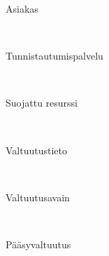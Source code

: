 

\begin{description}
  \item[Asiakas]\hfill \\
    
  \item[Tunnistautumispalvelu]\hfill \\
    
  \item[Suojattu resurssi]\hfill \\
    
  \item[Valtuutustieto]\hfill \\
    
  \item[Valtuutusavain]\hfill \\
    
  \item[Pääsyvaltuutus]\hfill \\
    
\end{description}